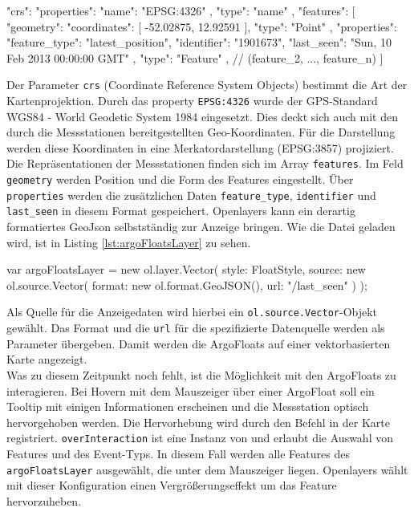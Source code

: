 \begin{javascript}[label={lst:argGeoJson}, caption={Gekürzte geoJSON zur Darstellung der Argo-Floats}]
 {
"crs": {
    "properties": {
      "name": "EPSG:4326"
    },
    "type": "name"
  },
  "features": [
    {
      "geometry": {
        "coordinates": [
          -52.02875,
          12.92591
        ],
        "type": "Point"
      },
      "properties": {
        "feature_type": "latest_position",
        "identifier": "1901673",
        "last_seen": "Sun, 10 Feb 2013 00:00:00 GMT"
      },
      "type": "Feature"
    },
    // (feature_2, ..., feature_n)
    ]
}
\end{javascript}

Der Parameter \texttt{crs} (Coordinate Reference System Objects) bestimmt die Art der Kartenprojektion. Durch das property \texttt{EPSG:4326} wurde der GPS-Standard WGS84 - World Geodetic System 1984 eingesetzt. Dies deckt sich auch mit den durch die Messstationen bereitgestellten Geo-Koordinaten. Für die Darstellung werden diese Koordinaten in eine Merkatordarstellung (EPSG:3857) projiziert.
\\
Die Repräsentationen der Messstationen finden sich im Array \texttt{features}. Im Feld \texttt{geometry} werden Position und die Form des Features eingestellt. Über \texttt{properties} werden die zusätzlichen Daten \texttt{feature\_type}, \texttt{identifier} und \texttt{last\_seen} in diesem Format gespeichert.
Openlayers kann ein derartig formatiertes GeoJson selbstständig zur Anzeige bringen. Wie die Datei geladen wird, ist in Listing \ref{lst:argoFloatsLayer} zu sehen.
\pagebreak
\begin{javascript}[label={lst:argoFloatsLayer}, caption={Die Funktion argoFloatsLayer}]
var argoFloatsLayer = new ol.layer.Vector({
    style: FloatStyle,
    source: new ol.source.Vector({
        format: new ol.format.GeoJSON(),
        url: "/last_seen"
    })
});
\end{javascript}
Als Quelle für die Anzeigedaten wird hierbei ein \texttt{ol.source.Vector}-Objekt gewählt. Das Format und die \texttt{url} für die spezifizierte Datenquelle werden als Parameter übergeben.
Damit werden die ArgoFloats auf einer vektorbasierten Karte angezeigt.
\\
Was zu diesem Zeitpunkt noch fehlt, ist die Möglichkeit mit den ArgoFloats zu interagieren. Bei Hovern mit dem Mauszeiger über einer ArgoFloat soll ein Tooltip mit einigen Informationen erscheinen und die Messstation optisch hervorgehoben werden.  Die Hervorhebung wird durch den Befehl  in der Karte registriert. \texttt{overInteraction} ist eine Instanz von  und erlaubt die Auswahl von Features und des Event-Typs. In diesem Fall werden alle Features des \texttt{argoFloatsLayer} ausgewählt, die unter dem Mauszeiger liegen. Openlayers wählt mit dieser Konfiguration einen Vergrößerungseffekt um das Feature hervorzuheben.

